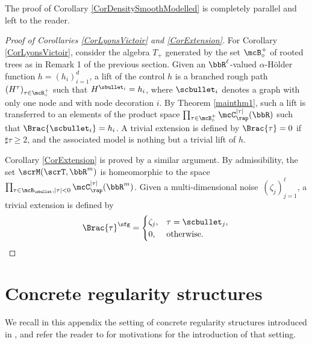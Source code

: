 The proof of Corollary \ref{CorDensitySmoothModelled} is completely parallel and left to the reader.

\begin{proof}[Proof of Corollaries \ref{CorLyonsVictoir} and \ref{CorExtension}]
For Corollary \ref{CorLyonsVictoir}, consider the algebra $T_+$ generated by the set $\mcB_\circ^+$ of rooted trees as in Remark 1 of the previous section. Given an $\bbR^\ell$\nobreakdash-valued $\alpha$-Hölder function $h=(h_i)_{i=1}^d$, a lift of the control $h$ is a branched rough path $(H^\tau)_{\tau\in\mcB_\circ^+}$ such that $H^{\sbullet_i}=h_i$, where $\scbullet_i$ denotes a graph with only one node and with node decoration $i$. By Theorem \ref{mainthm1}, such a lift is transferred to an elements of the product space $\prod_{\tau\in\mcB_\circ^+} \mcC_\rap^{|\tau|}(\bbR)$ such that $\Brac{\scbullet_i}=h_i$. A trivial extension is defined by $\Brac{\tau}=0$ if $\sharp\tau\ge2$, and the associated model is nothing but a trivial lift of $h$.

Corollary \ref{CorExtension} is proved by a similar argument. By admissibility, the set $\scrM(\scrT,\bbR^m)$ is homeomorphic to the space $\prod_{\tau\in\mcB_\sbullet, |\tau|<0} \mcC_\rap^{|\tau|}(\bbR^m)$.
Given a multi-dimensional noise~$(\zeta_j)_{j=1}^\ell$, a trivial extension is defined by\vspace*{-3pt}
\[
\Brac{\tau}^{\sfg}=
\begin{cases}
\zeta_j, & \tau=\scbullet_j,\\
0, & \text{otherwise}.
\end{cases} \qedhere
\]
\end{proof}

\appendix
\section{Concrete regularity structures}
\label{SectionAppendixConcreteRS}

We recall in this appendix the setting of concrete regularity structures introduced in \cite{BH}, and refer the reader to \cite[\S2]{BH} for motivations for the introduction of that setting.

